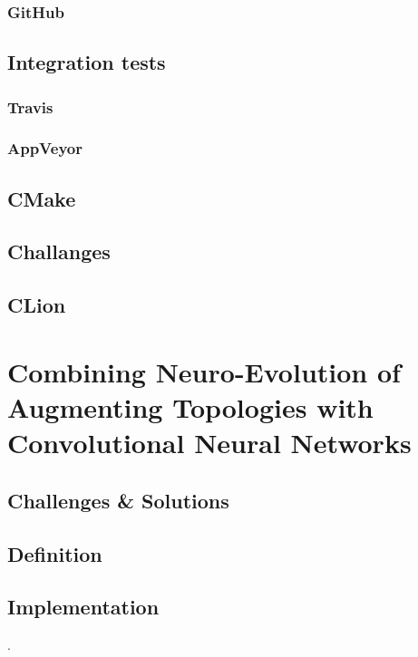 \documentclass[11pt]{article}
\begin{document}
			\subsubsection{GitHub}
				
		\subsection{Integration tests}
			
			\subsubsection{Travis}
				
			\subsubsection{AppVeyor}
				
		\subsection{CMake}
			
		\subsection{Challanges}
			\subsection{CLion}
				
	\newpage

	\section{Combining Neuro-Evolution of Augmenting Topologies with Convolutional Neural Networks}
		\subsection{Challenges \& Solutions}
			
		\subsection{Definition}
			
		\subsection{Implementation}
			.
	\newpage
\end{document}
